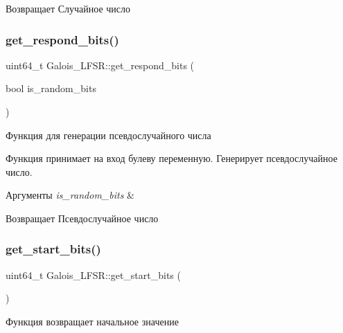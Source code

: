 \begin{DoxyReturn}{Возвращает}
Случайное число 
\end{DoxyReturn}
\mbox{\label{classGalois__LFSR_a1ceda4d66d840ff703cd14a3919b2f8b}} 
\subsubsection{\texorpdfstring{get\+\_\+respond\+\_\+bits()}{get\_respond\_bits()}}
{\footnotesize\ttfamily uint64\+\_\+t Galois\+\_\+\+L\+F\+S\+R\+::get\+\_\+respond\+\_\+bits (\begin{DoxyParamCaption}\item[{bool}]{is\+\_\+random\+\_\+bits }\end{DoxyParamCaption})}



Функция для генерации псевдослучайного числа 

Функция принимает на вход булеву переменную. Генерирует псевдослучайное число.


\begin{DoxyParams}{Аргументы}
{\em is\+\_\+random\+\_\+bits} & \\
\hline
\end{DoxyParams}
\begin{DoxyReturn}{Возвращает}
Псевдослучайное число 
\end{DoxyReturn}
\mbox{\label{classGalois__LFSR_aea6f1eea9ba930bb7419426a45a59c5c}} 
\subsubsection{\texorpdfstring{get\+\_\+start\+\_\+bits()}{get\_start\_bits()}}
{\footnotesize\ttfamily uint64\+\_\+t Galois\+\_\+\+L\+F\+S\+R\+::get\+\_\+start\+\_\+bits (\begin{DoxyParamCaption}{ }\end{DoxyParamCaption})}



Функция возвращает начальное значение 


